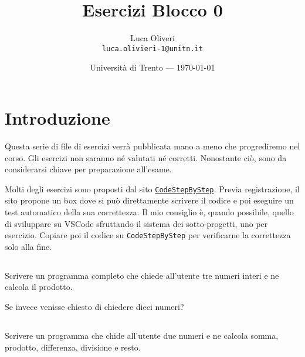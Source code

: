 \documentclass{article}
\title{Esercizi Blocco 0} %
\author{Luca Oliveri\\ \texttt{luca.olivieri-1@unitn.it}} %
\date{Università di Trento --- \today} %
\begin{document}
\maketitle %


\section*{Introduzione} %
Questa serie di file di esercizi verrà pubblicata mano a meno che progrediremo nel corso. Gli esercizi non saranno né valutati né corretti. Nonostante ciò, sono da considerarsi chiave per preparazione all'esame.


\begin{info} 
	Molti degli esercizi sono proposti dal sito \href{https://www.codestepbystep.com/problem/list/cpp}{\texttt{CodeStepByStep}}. Previa registrazione, il sito propone un box dove si può direttamente scrivere il codice e poi eseguire un test automatico della sua correttezza. Il mio consiglio è, quando possibile, quello di sviluppare su VSCode sfruttando il sistema dei sotto-progetti, uno per esercizio. Copiare poi il codice su \texttt{CodeStepByStep} per verificarne la correttezza solo alla fine. 
\end{info}


\setcounter{section}{0}


\subsection{} 
Scrivere un programma completo che chiede all'utente tre numeri interi e ne calcola il prodotto. 

\begin{warn}[Occhio:]Se invece venisse chiesto di chiedere dieci numeri?
\end{warn}


\subsection{}
Scrivere un programma che chide all'utente due numeri e ne calcola somma, prodotto, differenza, divisione e resto.
\end{document}
